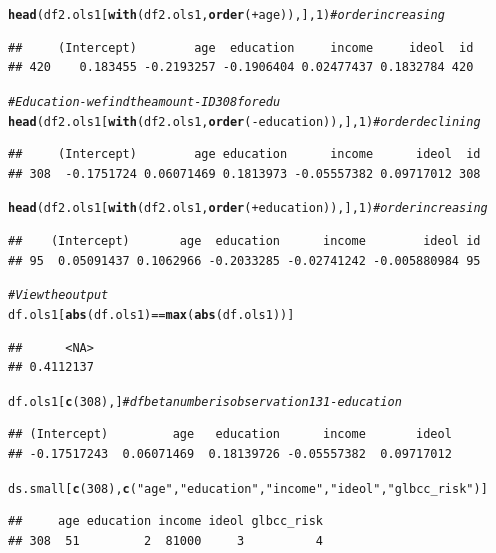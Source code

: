 \documentclass[11pt,openany]{book}\usepackage[]{graphicx}\usepackage[]{color}
\makeatletter
\newcommand{\hlnum}[1]{\textcolor[rgb]{0.686,0.059,0.569}{#1}}%
\newcommand{\hlstr}[1]{\textcolor[rgb]{0.192,0.494,0.8}{#1}}%
\newcommand{\hlcom}[1]{\textcolor[rgb]{0.678,0.584,0.686}{\textit{#1}}}%
\newcommand{\hlopt}[1]{\textcolor[rgb]{0,0,0}{#1}}%
\newcommand{\hlstd}[1]{\textcolor[rgb]{0.345,0.345,0.345}{#1}}%
\newcommand{\hlkwd}[1]{\textcolor[rgb]{0.737,0.353,0.396}{\textbf{#1}}}%
\newenvironment{kframe}{%
 \def\at@end@of@kframe{}%
 \ifinner\ifhmode%
  \def\at@end@of@kframe{\end{minipage}}%
  \begin{minipage}{\columnwidth}%
 \fi\fi%
 \def\FrameCommand##1{\hskip\@totalleftmargin \hskip-\fboxsep
 \colorbox{shadecolor}{##1}\hskip-\fboxsep
     \hskip-\linewidth \hskip-\@totalleftmargin \hskip\columnwidth}%
 \MakeFramed {\advance\hsize-\width
   \@totalleftmargin\z@ \linewidth\hsize
   \@setminipage}}%
 {\par\unskip\endMakeFramed%
 \at@end@of@kframe}
\newenvironment{knitrout}{}{} %
\renewenvironment{knitrout}{\begin{singlespace}}{\end{singlespace}}
\makeatother
\begin{document}
\begin{knitrout}
\begin{kframe}
\begin{alltt}
\hlkwd{head}\hlstd{(df2.ols1[}\hlkwd{with}\hlstd{(df2.ols1,} \hlkwd{order}\hlstd{(}\hlopt{+}\hlstd{age)), ],} \hlnum{1}\hlstd{)}  \hlcom{# order increasing}
\end{alltt}
\begin{verbatim}
##     (Intercept)        age  education     income     ideol  id
## 420    0.183455 -0.2193257 -0.1906404 0.02477437 0.1832784 420
\end{verbatim}
\begin{alltt}
\hlcom{# Education - we find the amount - ID 308 for edu}
\hlkwd{head}\hlstd{(df2.ols1[}\hlkwd{with}\hlstd{(df2.ols1,} \hlkwd{order}\hlstd{(}\hlopt{-}\hlstd{education)), ],} \hlnum{1}\hlstd{)}  \hlcom{# order declining}
\end{alltt}
\begin{verbatim}
##     (Intercept)        age education      income      ideol  id
## 308  -0.1751724 0.06071469 0.1813973 -0.05557382 0.09717012 308
\end{verbatim}
\begin{alltt}
\hlkwd{head}\hlstd{(df2.ols1[}\hlkwd{with}\hlstd{(df2.ols1,} \hlkwd{order}\hlstd{(}\hlopt{+}\hlstd{education)), ],} \hlnum{1}\hlstd{)}  \hlcom{# order increasing}
\end{alltt}
\begin{verbatim}
##    (Intercept)       age  education      income        ideol id
## 95  0.05091437 0.1062966 -0.2033285 -0.02741242 -0.005880984 95
\end{verbatim}
\begin{alltt}
\hlcom{# View the output}
\hlstd{df.ols1[}\hlkwd{abs}\hlstd{(df.ols1)} \hlopt{==} \hlkwd{max}\hlstd{(}\hlkwd{abs}\hlstd{(df.ols1))]}
\end{alltt}
\begin{verbatim}
##      <NA> 
## 0.4112137
\end{verbatim}
\begin{alltt}
\hlstd{df.ols1[}\hlkwd{c}\hlstd{(}\hlnum{308}\hlstd{), ]}  \hlcom{# dfbeta number is observation 131 - education}
\end{alltt}
\begin{verbatim}
## (Intercept)         age   education      income       ideol 
## -0.17517243  0.06071469  0.18139726 -0.05557382  0.09717012
\end{verbatim}
\begin{alltt}
\hlstd{ds.small[}\hlkwd{c}\hlstd{(}\hlnum{308}\hlstd{),} \hlkwd{c}\hlstd{(}\hlstr{"age"}\hlstd{,} \hlstr{"education"}\hlstd{,} \hlstr{"income"}\hlstd{,} \hlstr{"ideol"}\hlstd{,} \hlstr{"glbcc_risk"}\hlstd{)]}
\end{alltt}
\begin{verbatim}
##     age education income ideol glbcc_risk
## 308  51         2  81000     3          4
\end{verbatim}
\end{kframe}
\end{knitrout}
\end{document}
